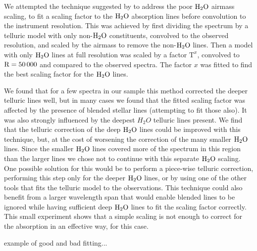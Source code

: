 We attempted the technique suggested by \citet{bertaux_tapas_2014} to address the poor \(\rm H_{2}O \) airmass scaling, to fit a scaling factor to the \(\rm {H}_{2}O \) absorption lines before convolution to the instrument resolution. This was achieved by first dividing the spectrum by a telluric model with only non-\(\rm H_{2}O \) constituents, convolved to the observed resolution, and scaled by the airmass to remove the non-\(\rm H_{2}O \) lines. Then a model with only \(\rm H_{2}O \) lines at full resolution was scaled by a factor \(\textrm{T}^{x} \), convolved to \(\rm R=50\,000 \) and compared to the observed spectra. The factor \(x \) was fitted to find the best scaling factor for the \(\rm H_{2}O \) lines.

We found that for a few spectra in our sample this method corrected the deeper telluric lines well, but in many cases we found that the fitted scaling factor was affected by the presence of blended stellar lines (attempting to fit those also). It was also strongly influenced by the deepest \(H_{2}O\) telluric lines present. We find that the telluric correction of the deep \(\rm H_{2}O \) lines could be improved with this technique, but, at the cost of worsening the correction of the many smaller \(\rm H_{2}O \) lines. Since the smaller \(\rm H_{2}O \) lines covered more of the spectrum in this region than the larger lines we chose not to continue with this separate \(\rm H_{2}O \) scaling. One possible solution for this would be to perform a piece-wise telluric correction, performing this step only for the deeper \( \rm H_{2}O\) lines, or by using one of the other tools that fits the telluric model to the observations. This technique could also benefit from a larger wavelength span that would enable blended lines to be ignored while having sufficient deep \(\rm H_{2}O\) lines to fit the scaling factor correctly. This small experiment shows that a simple scaling is not enough to correct for the absorption in an effective way, for this case.



  example of good and bad fitting...


